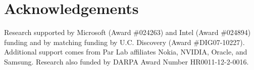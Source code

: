 \section{Acknowledgements}


Research supported by Microsoft (Award \#024263) and Intel (Award \#024894) funding and by matching funding by U.C. Discovery (Award \#DIG07-10227). 
Additional support comes from Par Lab affiliates Nokia, NVIDIA, Oracle, and Samsung. Research also funded by DARPA Award Number HR0011-12-2-0016. 

